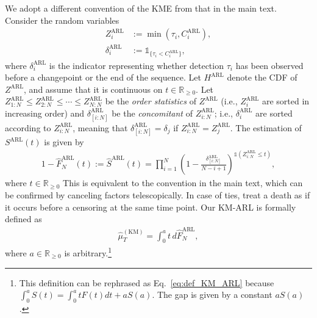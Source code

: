\documentclass{article}
\theoremstyle{plain}
\theoremstyle{definition}
\theoremstyle{remark}
\def\mbr{\mathbb{R}}
\def\mbone{\mathds{1}}
\begin{document}
We adopt a different convention of the KME from that in the main text.
Consider the random variables
\begin{align}
  Z_i^\mathrm{ARL}   &:= \min(\tau_i,C^\mathrm{ARL}_i),\\
  \delta_i^\mathrm{ARL} &:= \mbone_{\{\tau_i<C^\mathrm{ARL}_i\}},
\end{align}
where $\delta_i^\mathrm{ARL}$ is the indicator representing whether detection $\tau_i$ has been observed before a changepoint or the end of the sequence.
Let $H^\mathrm{ARL}$ denote the CDF of $Z^\mathrm{ARL}$, and assume that it is continuous on $t \in \mbr_{\geq 0}$.
Let $Z_{1:N}^\mathrm{ARL} \leq Z_{2:N}^\mathrm{ARL} \leq \cdots\le Z_{N:N}^\mathrm{ARL}$ be the \textit{order statistics} of $Z^\mathrm{ARL}$  (i.e., $Z_i^\mathrm{ARL}$ are sorted in increasing order) and  
$\delta_{[i:N]}^\mathrm{ARL}$ be the \textit{concomitant} of $Z_{i:N}^\mathrm{ARL}$; i.e., $\delta_i^\mathrm{ARL}$ are sorted according to $Z_{i:N}^\mathrm{ARL}$, meaning that $\delta_{[i:N]}^\mathrm{ARL}=\delta_j$ if $Z_{i:N}^\mathrm{ARL}=Z_j^\mathrm{ARL}$. The estimation of $S^\mathrm{ARL}(t)$ is given by
\begin{align}
    1 - \hat{F}_N^\mathrm{ARL}(t) := \hat{S}^\mathrm{ARL}(t) = \prod_{i=1}^N(1 - \frac{\delta_{[i:N]}^\mathrm{ARL}}{N - i + 1})^{\mbone(Z_{i:N}^\mathrm{ARL} \leq t)},
\end{align}
where $t \in \mbr_{\geq0}$
This is equivalent to the convention in the main text, which can be confirmed by canceling factors telescopically. In case of ties, treat a death as if it occurs before a censoring at the same time point.
Our KM-ARL is formally defined as
\begin{align}
    \hat{\mu}_T^\mathrm{(KM)} = \int_0^{a}  t \, d\hat{F}_N^\mathrm{ARL},
\end{align}
where $a \in \mbr_{\geq0}$ is arbitrary.\footnote{
    This definition can be rephrased as Eq.~\eqref{eq:def_KM_ARL} because $\int_0^a S(t) = \int_0^a t F(t) dt + a S(a)$. The gap is given by a constant $aS(a)$.
} %
\end{document}
